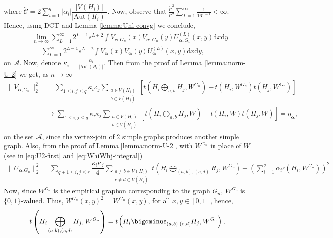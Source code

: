 \documentclass[11pt,reqno]{amsart}
\numberwithin{equation}{section}
\theoremstyle{definition}
\begin{document}
where $\tilde{\mathcal{C}} = 2\sum_{i=1}^{q}|\alpha_{i}|\dfrac{|V(H_{i})|}{|\text{Aut}(H_{i})|}$. Now, observe that $\frac{\tilde{\mathcal{C}}^{2}}{\mathcal{C}^{2}} \sum_{L=1}^{\infty}\frac{1}{16^{L-1}} <\infty$. Hence, using DCT and Lemma \ref{lemma:Unl-convg} we conclude,
\begin{align}\label{eq:rest-term-convg-2}
   & \lim_{n \rightarrow \infty} \sum_{L=1}^{\infty}2^{L-1}s^{L+2}\int V_{\bm \alpha, G_n}(x)V_{\bm \alpha, G_n}(y)U_{\bm \alpha, G_n}^{(L)}(x,y)\mathrm{d}x\mathrm{d}y \nonumber \\ 
   & = \sum_{L=1}^{\infty}2^{L-1}s^{L+2}\int V_{\bm \alpha}(x)V_{\bm \alpha}(y)U_{\bm \alpha}^{(L)}(x,y)\mathrm{d}x\mathrm{d}y , 
\end{align} 
on $\mathcal{A}$.
Now, denote $\kappa_i = \frac{\alpha_i}{|\mathrm{Aut}(H_i)|}$. Then from the proof of Lemma \ref{lemma:norm-U-2} we get, as $n \rightarrow \infty$
\begin{align}\label{eq:VGn}
    \|V_{\bm \alpha, G_n}\|_{2}^{2} & = \sum_{1 \leq i,j \leq q} \kappa_i \kappa_j \sum_{\substack{a\in V(H_{i})\\b\in V(H_{j})}}\left[t\left(H_{i}\bigoplus_{a,b}H_{j},W^{G_{n}}\right) - t(H_{i},W^{G_{n}})t(H_{j},W^{G_{n}})\right] \nonumber \\ 
    & \rightarrow \sum_{1 \leq i,j \leq q} \kappa_i \kappa_j \sum_{\substack{a\in V(H_{i})\\b\in V(H_{j})}}\left[t\left(H_{i}\bigoplus_{a,b}H_{j},W\right) - t(H_{i},W)t(H_{j},W)\right] = \eta_{\bm \alpha} ,  
\end{align}
on the set $\mathcal A$, since the vertex-join of 2 simple graphs produces another simple graph. 
Also, from the proof of Lemma \ref{lemma:norm-U-2}, with $W^{G_{n}}$ in place of $W$ (see in \eqref{eq:U2-first} and \eqref{eq:WhiWhj-integral}) 
\begin{align*}
    \|U_{\bm \alpha, G_n}\|_{2}^{2} = \sum_{q+1 \leq i,j \leq r} \dfrac{ \kappa_i \kappa_j }{4} \sum_{\substack{a\neq b\in V(H_{i})\\c\neq d\in V(H_{j})}}t\left(H_{i}\bigoplus_{(a,b),(c,d)}H_{j},W^{G_{n}}\right) - \left(\sum_{i=1}^{q}\alpha_{i}c(H_{i},W^{G_{n}})\right)^{2}
\end{align*}
Now, since $W^{G_{n}}$ is the empirical graphon corresponding to the graph $G_{n}$, $W^{G_{n}}$ is $\{0,1\}$-valued. Thus, $W^{G_{n}}(x, y)^2= W^{G_{n}} (x, y)$, for all $x, y \in [0, 1]$,  hence, 
\begin{align*}
    t\left(H_{i}\bigoplus_{(a,b),(c,d)}H_{j},W^{G_{n}}\right) = t\left(H_{i}\bigominus_{(a,b),(c,d)}H_{j},W^{G_{n}}\right) , 
\end{align*}
\end{document}
